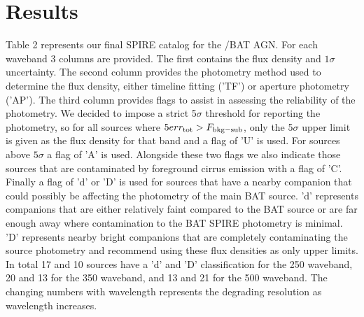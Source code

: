 \section{Results}
Table 2 represents our final SPIRE catalog for the \swift/BAT AGN. For each waveband 3 columns are provided. The first contains the flux density and $1\sigma$ uncertainty. The second column provides the photometry method used to determine the flux density, either timeline fitting ('TF') or aperture photometry ('AP'). The third column provides flags to assist in assessing the reliability of the photometry. We decided to impose a strict 5$\sigma$ threshold for reporting the photometry, so for all sources where $5 err_{\rm{tot}} > F_{\rm{bkg-sub}}$, only the 5$\sigma$ upper limit is given as the flux density for that band and a flag of 'U' is used. For sources above $5\sigma$ a flag of 'A' is used. Alongside these two flags we also indicate those sources that are contaminated by foreground cirrus emission with a flag of 'C'. Finally a flag of 'd' or 'D' is used for sources that have a nearby companion that could possibly be affecting the photometry of the main BAT source. 'd' represents companions that are either relatively faint compared to the BAT source or are far enough away where contamination to the BAT SPIRE photometry is minimal. 'D' represents nearby bright companions that are completely contaminating the source photometry and recommend using these flux densities as only upper limits. In total 17 and 10 sources have a 'd' and 'D' classification for the 250 \um{} waveband, 20 and 13 for the 350 \um{} waveband, and 13 and 21 for the 500 \um{} waveband. The changing numbers with wavelength represents the degrading resolution as wavelength increases.